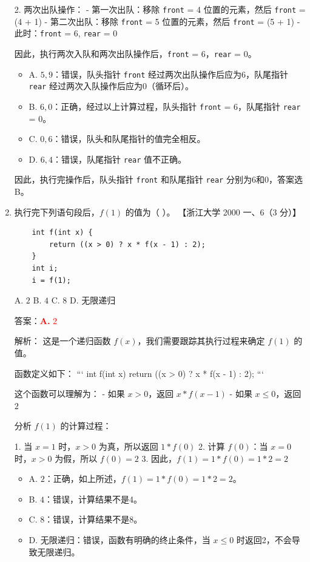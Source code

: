 \documentclass[lang=cn,newtx,10pt,scheme=chinese]{../../../elegantbook}
\begin{document}
\begin{enumerate}
    2. 两次出队操作：
       - 第一次出队：移除 \texttt{front} = 4 位置的元素，然后 \texttt{front} = (4 + 1) %
       - 第二次出队：移除 \texttt{front} = 5 位置的元素，然后 \texttt{front} = (5 + 1) %
       - 此时：\texttt{front} = 6, \texttt{rear} = 0

    因此，执行两次入队和两次出队操作后，\texttt{front} = 6，\texttt{rear} = 0。

    \begin{itemize}
        \item A. $5, 9$：错误，队头指针 \texttt{front} 经过两次出队操作后应为6，队尾指针 \texttt{rear} 经过两次入队操作后应为0（循环后）。
        \item B. $6, 0$：正确，经过以上计算过程，队头指针 \texttt{front} = 6，队尾指针 \texttt{rear} = 0。
        \item C. $0, 6$：错误，队头和队尾指针的值完全相反。
        \item D. $6, 4$：错误，队尾指针 \texttt{rear} 值不正确。
    \end{itemize}

    因此，执行完操作后，队头指针 \texttt{front} 和队尾指针 \texttt{rear} 分别为6和0，答案选B。

    \item 执行完下列语句段后，$f(1)$ 的值为（ ）。  
    【浙江大学 2000 一、6（3 分）】  

    \begin{verbatim}
    int f(int x) {
        return ((x > 0) ? x * f(x - 1) : 2);
    }
    int i;
    i = f(1);
    \end{verbatim}

    A. $2$ \quad B. $4$ \quad C. $8$ \quad D. 无限递归  

    答案：\textcolor{red}{\textbf{A.} $2$}

    解析：
    这是一个递归函数 $f(x)$，我们需要跟踪其执行过程来确定 $f(1)$ 的值。

    函数定义如下：
    ```
    int f(int x) {
        return ((x > 0) ? x * f(x - 1) : 2);
    }
    ```

    这个函数可以理解为：
    - 如果 $x > 0$，返回 $x * f(x - 1)$
    - 如果 $x \leq 0$，返回 $2$

    分析 $f(1)$ 的计算过程：

    1. 当 $x = 1$ 时，$x > 0$ 为真，所以返回 $1 * f(0)$
    2. 计算 $f(0)$：当 $x = 0$ 时，$x > 0$ 为假，所以 $f(0) = 2$
    3. 因此，$f(1) = 1 * f(0) = 1 * 2 = 2$

    \begin{itemize}
        \item A. $2$：正确，如上所述，$f(1) = 1 * f(0) = 1 * 2 = 2$。
        \item B. $4$：错误，计算结果不是4。
        \item C. $8$：错误，计算结果不是8。
        \item D. 无限递归：错误，函数有明确的终止条件，当 $x \leq 0$ 时返回2，不会导致无限递归。
    \end{itemize}


\end{enumerate}
\end{document}

